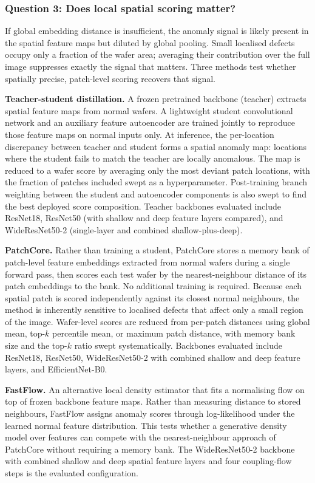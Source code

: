 \documentclass[11pt]{article}
\begin{document}
\subsubsection{Question 3: Does local spatial scoring matter?}

If global embedding distance is insufficient, the anomaly signal is likely
present in the spatial feature maps but diluted by global pooling. Small
localised defects occupy only a fraction of the wafer area; averaging their
contribution over the full image suppresses exactly the signal that matters.
Three methods test whether spatially precise, patch-level scoring recovers
that signal.

\textbf{Teacher-student distillation.} A frozen pretrained backbone (teacher)
extracts spatial feature maps from normal wafers. A lightweight student
convolutional network and an auxiliary feature autoencoder are trained jointly
to reproduce those feature maps on normal inputs only. At inference, the
per-location discrepancy between teacher and student forms a spatial anomaly
map: locations where the student fails to match the teacher are locally
anomalous. The map is reduced to a wafer score by averaging only the most
deviant patch locations, with the fraction of patches included swept as a
hyperparameter. Post-training branch weighting between the student and
autoencoder components is also swept to find the best deployed score
composition. Teacher backbones evaluated include ResNet18, ResNet50 (with
shallow and deep feature layers compared), and WideResNet50-2 (single-layer
and combined shallow-plus-deep).

\textbf{PatchCore.} Rather than training a student, PatchCore stores a
memory bank of patch-level feature embeddings extracted from normal wafers
during a single forward pass, then scores each test wafer by the nearest-neighbour
distance of its patch embeddings to the bank. No additional training is
required. Because each spatial patch is scored independently against its
closest normal neighbours, the method is inherently sensitive to localised
defects that affect only a small region of the image. Wafer-level scores
are reduced from per-patch distances using global mean, top-$k$ percentile
mean, or maximum patch distance, with memory bank size and the top-$k$ ratio
swept systematically. Backbones evaluated include ResNet18, ResNet50,
WideResNet50-2 with combined shallow and deep feature layers, and EfficientNet-B0.

\textbf{FastFlow.} An alternative local density estimator that fits a
normalising flow on top of frozen backbone feature maps. Rather than measuring
distance to stored neighbours, FastFlow assigns anomaly scores through
log-likelihood under the learned normal feature distribution. This tests
whether a generative density model over features can compete with the
nearest-neighbour approach of PatchCore without requiring a memory bank.
The WideResNet50-2 backbone with combined shallow and deep spatial feature
layers and four coupling-flow steps is the evaluated configuration.
\end{document}
